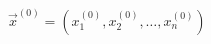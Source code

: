 \documentclass[A4,11pt]{article}
\begin{document}
\thispagestyle{empty}
$\vec{x}^{(0)}=\left(x_1^{(0)}, x_2^{(0)}, \dots, x_n^{(0)}\right)$
\end{document}
